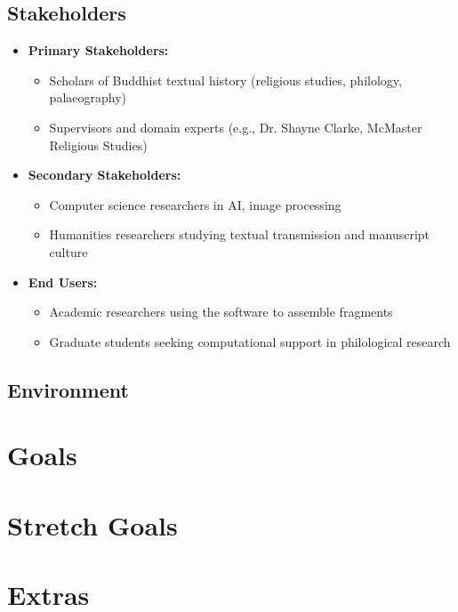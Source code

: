 \documentclass{article}
\begin{document}
\subsection{Stakeholders}
\begin{itemize}
    \item \textbf{Primary Stakeholders:}
    \begin{itemize} 
        \item Scholars of Buddhist textual history (religious studies, philology, palaeography)
        \item Supervisors and domain experts (e.g., Dr. Shayne Clarke, McMaster Religious Studies)
    \end{itemize}

    \item \textbf{Secondary Stakeholders:}
    \begin{itemize} 
        \item Computer science researchers in AI, image processing
        \item Humanities researchers studying textual transmission and manuscript culture

    \end{itemize}
    
    \item \textbf{End Users:}
    \begin{itemize} 
        \item Academic researchers using the software to assemble fragments
        \item Graduate students seeking computational support in philological research
    \end{itemize}
\end{itemize}

\subsection{Environment}


\section{Goals}

\section{Stretch Goals}

\section{Extras}
\end{document}
